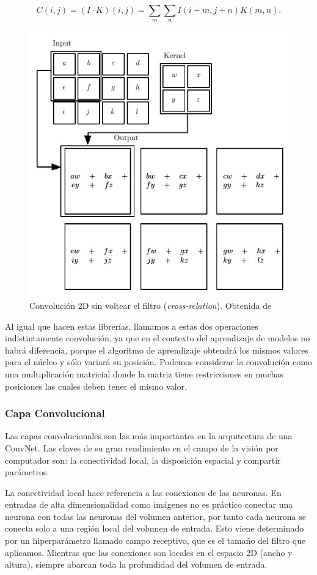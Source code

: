 $$C(i,j)= (I \cdot K)(i,j) = \sum_m \sum_n I(i+m,j+n)K(m,n).$$


\begin{figure}
    \centering
    \includegraphics[width=0.75\linewidth]{Plantilla_TFG_latex//imagenes//Inf//2.Fund/Conv.png}
    \caption{Convolución 2D sin voltear el filtro (\textit{cross-relation}). Obtenida de \cite{GoodFellowBook}}
    \label{fig:3.Conv}
\end{figure}


Al igual que hacen estas librerías, llamamos a estas dos operaciones indistintamente convolución, ya que en el contexto del aprendizaje de modelos no habrá diferencia, porque el algoritmo de aprendizaje obtendrá los mismos valores para el núcleo y sólo variará su posición. Podemos considerar la convolución como una multiplicación matricial donde la matriz tiene restricciones en muchas posiciones las cuales deben tener el mismo valor.

\subsubsection{Capa Convolucional}


Las capas convolucionales son las más importantes en la arquitectura de una ConvNet. Las claves de su gran rendimiento en el campo de la visión por computador son: la conectividad local, la disposición espacial y compartir parámetros.

La conectividad local hace referencia a las conexiones de las neuronas. En entradas de alta dimensionalidad como imágenes no es práctico conectar una neurona con todas las neuronas del volumen anterior, por tanto cada neurona se conecta solo a una región local del volumen de entrada. Esto viene determinado por un hiperparámetro llamado campo receptivo, que es el tamaño del filtro que aplicamos. Mientras que las conexiones son locales en el espacio 2D (ancho y altura), siempre abarcan toda la profundidad del volumen de entrada.

